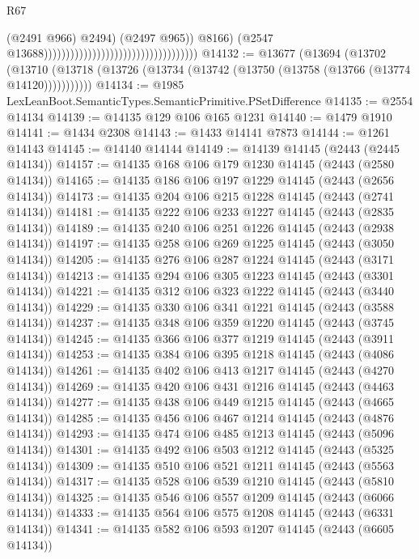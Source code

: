 \begin{lexlean}{R67}
\begin{coremodule}
                                                                              (@2491 @966)
                                                                              @2494)
                                                                            (@2497 @965))
                                                                          @8166)
                                                                        (@2547
                                                                          @13688)))))))))))))))))))))))))))))))))))
@14132 := @13677
    (@13694
      (@13702
        (@13710 (@13718 (@13726 (@13734 (@13742 (@13750 (@13758 (@13766 (@13774 @14120)))))))))))
@14134 := @1985 LexLeanBoot.SemanticTypes.SemanticPrimitive.PSetDifference
@14135 := @2554 @14134
@14139 := @14135 @129 @106 @165 @1231
@14140 := @1479 @1910
@14141 := @1434 @2308
@14143 := @1433 @14141 @7873
@14144 := @1261 @14143
@14145 := @14140 @14144
@14149 := @14139 @14145 (@2443 (@2445 @14134))
@14157 := @14135 @168 @106 @179 @1230 @14145 (@2443 (@2580 @14134))
@14165 := @14135 @186 @106 @197 @1229 @14145 (@2443 (@2656 @14134))
@14173 := @14135 @204 @106 @215 @1228 @14145 (@2443 (@2741 @14134))
@14181 := @14135 @222 @106 @233 @1227 @14145 (@2443 (@2835 @14134))
@14189 := @14135 @240 @106 @251 @1226 @14145 (@2443 (@2938 @14134))
@14197 := @14135 @258 @106 @269 @1225 @14145 (@2443 (@3050 @14134))
@14205 := @14135 @276 @106 @287 @1224 @14145 (@2443 (@3171 @14134))
@14213 := @14135 @294 @106 @305 @1223 @14145 (@2443 (@3301 @14134))
@14221 := @14135 @312 @106 @323 @1222 @14145 (@2443 (@3440 @14134))
@14229 := @14135 @330 @106 @341 @1221 @14145 (@2443 (@3588 @14134))
@14237 := @14135 @348 @106 @359 @1220 @14145 (@2443 (@3745 @14134))
@14245 := @14135 @366 @106 @377 @1219 @14145 (@2443 (@3911 @14134))
@14253 := @14135 @384 @106 @395 @1218 @14145 (@2443 (@4086 @14134))
@14261 := @14135 @402 @106 @413 @1217 @14145 (@2443 (@4270 @14134))
@14269 := @14135 @420 @106 @431 @1216 @14145 (@2443 (@4463 @14134))
@14277 := @14135 @438 @106 @449 @1215 @14145 (@2443 (@4665 @14134))
@14285 := @14135 @456 @106 @467 @1214 @14145 (@2443 (@4876 @14134))
@14293 := @14135 @474 @106 @485 @1213 @14145 (@2443 (@5096 @14134))
@14301 := @14135 @492 @106 @503 @1212 @14145 (@2443 (@5325 @14134))
@14309 := @14135 @510 @106 @521 @1211 @14145 (@2443 (@5563 @14134))
@14317 := @14135 @528 @106 @539 @1210 @14145 (@2443 (@5810 @14134))
@14325 := @14135 @546 @106 @557 @1209 @14145 (@2443 (@6066 @14134))
@14333 := @14135 @564 @106 @575 @1208 @14145 (@2443 (@6331 @14134))
@14341 := @14135 @582 @106 @593 @1207 @14145 (@2443 (@6605 @14134))

\end{coremodule}
\end{lexlean}
